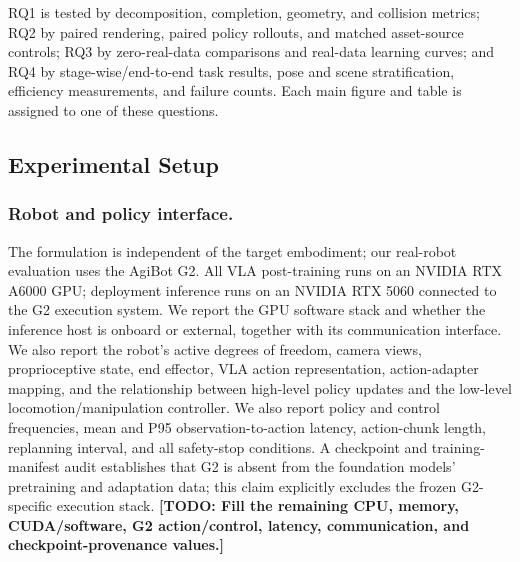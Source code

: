 \documentclass[letterpaper,10pt,conference]{ieeeconf}
\newcommand{\todo}[1]{\textbf{[TODO: #1]}}
\begin{document}
RQ1 is tested by decomposition, completion, geometry, and collision metrics;
RQ2 by paired rendering, paired policy rollouts, and matched asset-source
controls; RQ3 by zero-real-data
comparisons and real-data learning curves; and RQ4 by stage-wise/end-to-end task
results, pose and scene stratification, efficiency measurements, and failure
counts. Each main figure and table is assigned to one of these questions.

\subsection{Experimental Setup}
\subsubsection{Robot and policy interface.}
The formulation is independent of the target embodiment; our real-robot
evaluation uses the AgiBot G2. All VLA post-training runs on an NVIDIA
RTX A6000 GPU; deployment inference runs on an NVIDIA RTX 5060 connected to the
G2 execution system. We report the GPU software stack and whether the inference
host is onboard or external, together with its communication interface. We also
report the robot's active degrees of freedom,
camera views, proprioceptive state, end effector, VLA action representation,
action-adapter mapping, and the relationship between high-level policy updates
and the low-level locomotion/manipulation controller. We also report policy and
control frequencies, mean and P95 observation-to-action latency, action-chunk
length, replanning interval, and all safety-stop conditions. A checkpoint and
training-manifest audit establishes that G2 is absent from the foundation models'
pretraining and adaptation data; this claim explicitly excludes the frozen
G2-specific execution stack. \todo{Fill the remaining CPU, memory, CUDA/software,
G2 action/control, latency, communication, and checkpoint-provenance values.}
\end{document}
